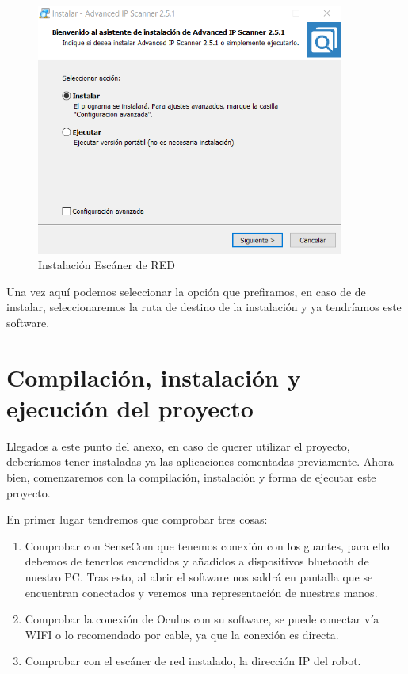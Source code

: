 \begin{itemize}
    \begin{figure}[h]
\centering
\label{Instalación Escáner de RED}
\includegraphics[width=0.9\textwidth]{img/ipad.PNG}
\caption{Instalación Escáner de RED}
\end{figure}

\newpage
Una vez aquí podemos seleccionar la opción que prefiramos, en caso de de instalar, seleccionaremos la ruta de destino de la instalación y ya tendríamos este software.

\end{itemize}


\newpage
\section{Compilación, instalación y ejecución del proyecto}
Llegados a este punto del anexo, en caso de querer utilizar el proyecto, deberíamos tener instaladas ya las aplicaciones comentadas previamente.
Ahora bien, comenzaremos con la compilación, instalación y forma de ejecutar este proyecto.

En primer lugar tendremos que comprobar tres cosas:
\begin{enumerate}
    \item Comprobar con SenseCom que tenemos conexión con los guantes, para ello debemos de tenerlos encendidos y añadidos a dispositivos bluetooth de nuestro PC. Tras esto, al abrir el software nos saldrá en pantalla que se encuentran conectados y veremos una representación de nuestras manos.
    \item Comprobar la conexión de Oculus con su software, se puede conectar vía WIFI o lo recomendado por cable, ya que la conexión es directa.
    \item Comprobar con el escáner de red instalado, la dirección IP del robot.
\end{enumerate}

